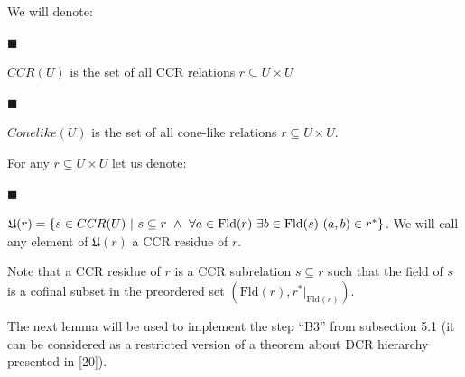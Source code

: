  
  
 
 
 
We will denote:\par
  
\par\noindent  $\blacksquare$ 
 
$CCR(U)$ is the set of all CCR relations $r\subseteq U\times U$\par
 
 
 
\par\noindent  $\blacksquare$ 
 
$Conelike(U)$ is the set of all cone-like relations $r\subseteq U\times U$.\par
 
 
  
 
 
For any $r\subseteq U\times U$ let us denote:\par
  
\par\noindent  $\blacksquare$ 
 
$\mathfrak{U}(r)=\{s\in CCR(U)\leavevmode\nobreak\ |\leavevmode\nobreak\ s%
\subseteq r\leavevmode\nobreak\ \wedge\leavevmode\nobreak\ \forall a\in\mathrm%
{Fld}(r)\leavevmode\nobreak\ \exists b\in\mathrm{Fld}(s)\leavevmode\nobreak\ (%
a,b)\in r^{*}\}$. We will call any element of $\mathfrak{U}(r)$ a CCR residue of $r$.\par
 
 
  
 
 
Note that a CCR residue of $r$ is a CCR subrelation $s\subseteq r$ such that the field of $s$ is a cofinal subset in the preordered set $(\mathrm{Fld}(r),r^{*}|_{\mathrm{Fld}(r)})$.\par
 
 
 
The next lemma will be used to implement the step “B3” from subsection 5.1 (it can be considered as a restricted version of a theorem about DCR hierarchy presented in [20]).\par
 
